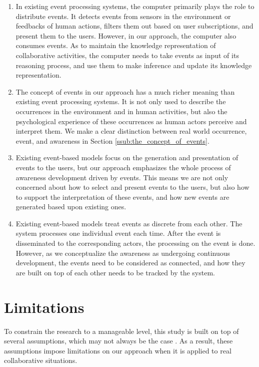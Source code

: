 \begin{enumerate}
   \item In existing event processing systems, the computer primarily plays the role to distribute events. It detects events from sensors in the environment or feedbacks of human actions, filters them out based on user subscriptions, and present them to the users. However, in our approach, the computer also consumes events. As to maintain the knowledge representation of collaborative activities, the computer needs to take events as input of its reasoning process, and use them to make inference and update its knowledge representation. 
   \item The concept of events in our approach has a much richer meaning than existing event processing systems. It is not only used to describe the occurrences in the environment and in human activities, but also the psychological experience of these occurrences as human actors perceive and interpret them. We make a clear distinction between real world occurrence, event, and awareness in Section \ref{ssub:the_concept_of_events}.
   \item Existing event-based models focus on the generation and presentation of events to the users, but our approach emphasizes the whole process of awareness development driven by events. This means we are not only concerned about how to select and present events to the users, but also how to support the interpretation of these events, and how new events are generated based upon existing ones.
   \item Existing event-based models treat events as discrete from each other. The system processes one individual event each time. After the event is disseminated to the corresponding actors, the processing on the event is done. However, as we conceptualize the awareness as undergoing continuous development, the events need to be considered as connected, and how they are built on top of each other needs to be tracked by the system.
\end{enumerate}
\section{Limitations} %
\label{sec:limitations_of_our_approach}
To constrain the research to a manageable level, this study is built on top of several assumptions, which may not always be the case . As a result, these assumptions impose limitations on our approach when it is applied to real collaborative situations.

